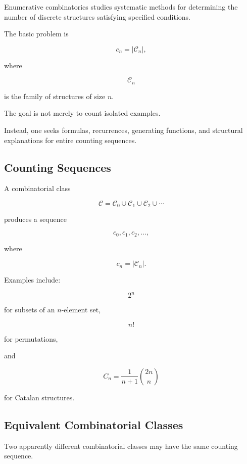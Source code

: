 Enumerative combinatorics studies systematic methods for determining
the number of discrete structures satisfying specified conditions.

The basic problem is

\[
\boxed{
c_n
=
|\mathcal{C}_n|,
}
\]

where

\[
\mathcal{C}_n
\]

is the family of structures of size \(n\).

The goal is not merely to count isolated examples.

Instead, one seeks formulas, recurrences, generating functions, and
structural explanations for entire counting sequences.

\subsection{Counting Sequences}
\label{subsec:enumerative-counting-sequences}

A combinatorial class

\[
\mathcal{C}
=
\mathcal{C}_0
\cup
\mathcal{C}_1
\cup
\mathcal{C}_2
\cup\cdots
\]

produces a sequence

\[
c_0,c_1,c_2,\ldots,
\]

where

\[
c_n=|\mathcal{C}_n|.
\]

Examples include:

\[
2^n
\]

for subsets of an \(n\)-element set,

\[
n!
\]

for permutations,

and

\[
C_n
=
\frac{1}{n+1}\binom{2n}{n}
\]

for Catalan structures.

\subsection{Equivalent Combinatorial Classes}
\label{subsec:equivalent-combinatorial-classes}

Two apparently different combinatorial classes may have the same
counting sequence.

